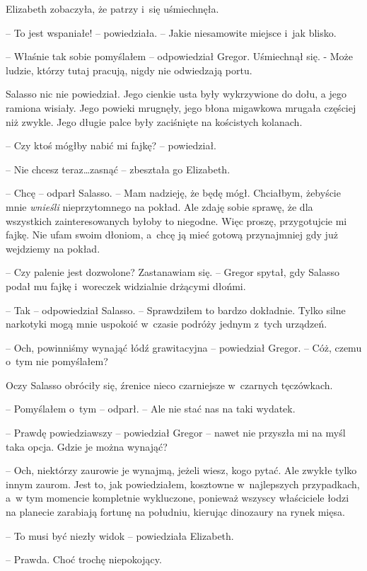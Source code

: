 \documentclass[oneside,polish,12pt,sfheadings]{mwbk}
\begin{document}
Elizabeth zobaczyła, że patrzy i~się uśmiechnęła.

-- To jest wspaniałe! -- powiedziała. -- Jakie niesamowite miejsce i~jak
blisko.

-- Właśnie tak sobie pomyślałem -- odpowiedział Gregor. Uśmiechnął się. -
Może ludzie, którzy tutaj pracują, nigdy nie odwiedzają portu.

Salasso nic nie powiedział. Jego cienkie usta były wykrzywione do dołu,
a jego ramiona wisiały. Jego powieki mrugnęły, jego błona migawkowa
mrugała częściej niż zwykle. Jego długie palce były zaciśnięte na
kościstych kolanach.

-- Czy ktoś mógłby nabić mi fajkę? -- powiedział.

-- Nie chcesz teraz\ldots zasnąć -- zbeształa go Elizabeth.

-- Chcę -- odparł Salasso. -- Mam nadzieję, że będę mógł. Chciałbym,
żebyście mnie \emph{wnieśli} nieprzytomnego na pokład. Ale zdaję sobie
sprawę, że dla wszystkich zainteresowanych byłoby to niegodne. Więc
proszę, przygotujcie mi fajkę. Nie ufam swoim dłoniom, a~chcę ją mieć
gotową przynajmniej gdy już wejdziemy na pokład.

-- Czy palenie jest dozwolone? Zastanawiam się. -- Gregor spytał, gdy
Salasso podał mu fajkę i~woreczek widzialnie drżącymi dłońmi.

-- Tak -- odpowiedział Salasso. -- Sprawdziłem to bardzo dokładnie. Tylko
silne narkotyki mogą mnie uspokoić w~czasie podróży jednym z~tych
urządzeń.

-- Och, powinniśmy wynająć łódź grawitacyjna -- powiedział Gregor. -- Cóż,
czemu o~tym nie pomyślałem?

Oczy Salasso obróciły się, źrenice nieco czarniejsze w~czarnych
tęczówkach.

-- Pomyślałem o~tym -- odparł. -- Ale nie stać nas na taki wydatek.

-- Prawdę powiedziawszy -- powiedział Gregor -- nawet nie przyszła mi na
myśl taka opcja. Gdzie je można wynająć?

-- Och, niektórzy zaurowie je wynajmą, jeżeli wiesz, kogo pytać. Ale
zwykłe tylko innym zaurom. Jest to, jak powiedziałem, kosztowne w~najlepszych przypadkach, a~w tym momencie kompletnie wykluczone,
ponieważ wszyscy właściciele łodzi na planecie zarabiają fortunę na
południu, kierując dinozaury na rynek mięsa.

-- To musi być niezły widok -- powiedziała Elizabeth.

-- Prawda. Choć trochę niepokojący.
\end{document}
